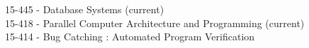 
\begin{projects}

	\course
	{15-445 -} {Database Systems (current)} \\
	\course
	{15-418 -} {Parallel Computer Architecture and Programming (current)} \\
    \course
    {15-414 -} {Bug Catching : Automated Program Verification} \\

\end{projects}
